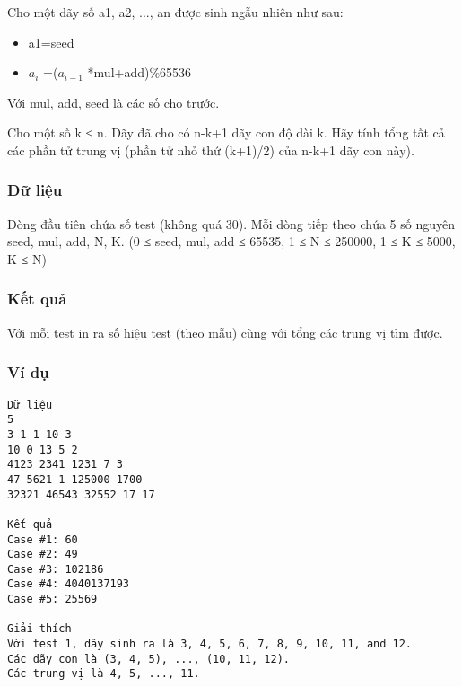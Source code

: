



   Cho một dãy số a1, a2, ..., an được sinh ngẫu nhiên như sau:  
\begin{itemize}
	\item     a1=seed   
	\item     $a_{i}$    =($a_{i-1}$    *mul+add)\%65536   
\end{itemize}

   Với mul, add, seed là các số cho trước.  

   Cho một số k ≤ n. Dãy đã cho có n-k+1 dãy con độ dài k. Hãy tính tổng tất cả các phần tử trung vị (phần tử nhỏ thứ (k+1)/2) của n-k+1 dãy con này).  

\subsubsection{   Dữ liệu  }

   Dòng đầu tiên chứa số test (không quá 30). Mỗi dòng tiếp theo chứa 5 số nguyên seed, mul, add, N, K. (0 ≤ seed, mul, add ≤ 65535, 1 ≤ N ≤ 250000, 1 ≤ K ≤ 5000, K ≤ N)  

\subsubsection{   Kết quả  }

   Với mỗi test in ra số hiệu test (theo mẫu) cùng với tổng các trung vị tìm được.  

\subsubsection{   Ví dụ  }
\begin{verbatim}
Dữ liệu
5
3 1 1 10 3
10 0 13 5 2
4123 2341 1231 7 3
47 5621 1 125000 1700
32321 46543 32552 17 17

Kết quả
Case #1: 60
Case #2: 49
Case #3: 102186
Case #4: 4040137193
Case #5: 25569

Giải thích
Với test 1, dãy sinh ra là 3, 4, 5, 6, 7, 8, 9, 10, 11, and 12.
Các dãy con là (3, 4, 5), ..., (10, 11, 12).
Các trung vị là 4, 5, ..., 11.
\end{verbatim}

